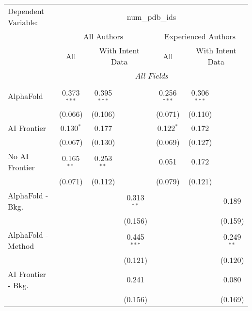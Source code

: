 \begingroup
\centering
\begin{tabular}{lcccccc}
   \tabularnewline \midrule \midrule
   Dependent Variable: & \multicolumn{6}{c}{num\_pdb\_ids}\\
 & \multicolumn{3}{c}{All Authors} & \multicolumn{3}{c}{Experienced Authors} \\
\cmidrule(lr){2-4} \cmidrule(lr){5-7}
 & \multicolumn{1}{c}{All} & \multicolumn{2}{c}{With Intent Data} & \multicolumn{1}{c}{All} & \multicolumn{2}{c}{With Intent Data} \\
\cmidrule(lr){2-2} \cmidrule(lr){3-4} \cmidrule(lr){5-5} \cmidrule(lr){6-7}
 & \multicolumn{6}{c}{\textit{All Fields}} \\ \\
   AlphaFold               & 0.373$^{***}$ & 0.395$^{***}$ &               & 0.256$^{***}$ & 0.306$^{***}$ &   \\   
                           & (0.066)       & (0.106)       &               & (0.071)       & (0.110)       &   \\   
   AI Frontier             & 0.130$^{*}$   & 0.177         &               & 0.122$^{*}$   & 0.172         &   \\   
                           & (0.067)       & (0.130)       &               & (0.069)       & (0.127)       &   \\   
   No AI Frontier          & 0.165$^{**}$  & 0.253$^{**}$  &               & 0.051         & 0.172         &   \\   
                           & (0.071)       & (0.112)       &               & (0.079)       & (0.121)       &   \\   
   AlphaFold - Bkg.        &               &               & 0.313$^{**}$  &               &               & 0.189\\   
                           &               &               & (0.156)       &               &               & (0.159)\\   
   AlphaFold - Method      &               &               & 0.445$^{***}$ &               &               & 0.249$^{**}$\\   
                           &               &               & (0.121)       &               &               & (0.120)\\   
   AI Frontier - Bkg.      &               &               & 0.241         &               &               & 0.080\\   
                           &               &               & (0.156)       &               &               & (0.169)\\   

\end{tabular}

